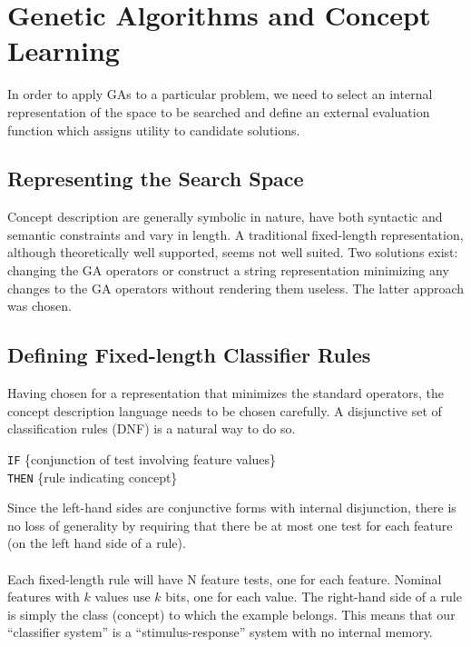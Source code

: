 \documentclass[../main.tex]{subfiles}
\begin{document}
\section{Genetic Algorithms and Concept Learning}
In order to apply GAs to a particular problem, we need to select an internal representation of the space to be searched
and define an external evaluation function which assigns utility to candidate solutions.

\subsection{Representing the Search Space}

Concept description are generally symbolic in nature, have both syntactic and semantic constraints and vary in length.
A traditional fixed-length representation, although theoretically well supported, seems not well suited. Two solutions
exist: changing the GA operators or construct a string representation minimizing any changes to the GA operators
without rendering them useless. The latter approach was chosen.

\subsection{Defining Fixed-length Classifier Rules}

Having chosen for a representation that minimizes the standard operators, the concept description language needs to be
chosen carefully. A disjunctive set of classification rules (DNF) is a natural way to do so.

\begin{mdframed}
\texttt{IF} \{conjunction of test involving feature values\} \\
\texttt{THEN} \{rule indicating concept\}
\end{mdframed}

Since the left-hand sides are conjunctive forms with internal disjunction, there is no loss of generality by requiring
that there be at most one test for each feature (on the left hand side of a rule).
\\\\
Each fixed-length rule will have N feature tests, one for each feature. Nominal features with $k$ values use $k$ bits,
one for each value. The right-hand side of a rule is simply the class (concept) to which the example belongs. This
means that our ``classifier system'' is a ``stimulus-response'' system with no internal memory.
\end{document}
